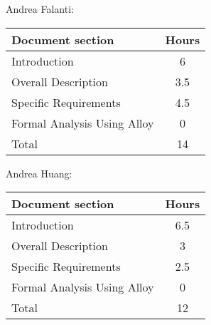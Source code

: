 Andrea Falanti:

\begin{tabular}{|l|c|}
    \hline
    Document section & Hours \\
    \hline
     Introduction & 6\\
     Overall Description & 3.5\\
     Specific Requirements & 4.5\\
     Formal Analysis Using Alloy & 0\\
     \hline
     Total & 14\\
     \hline
\end{tabular}
\vskip 0.3in

Andrea Huang:

\begin{tabular}{|l|c|}
    \hline
    Document section & Hours \\
    \hline
     Introduction &  6.5\\
     Overall Description & 3\\
     Specific Requirements & 2.5\\
     Formal Analysis Using Alloy & 0\\
     \hline
     Total & 12\\
     \hline
\end{tabular}